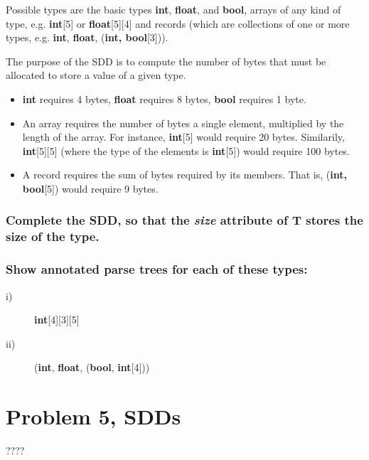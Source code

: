 Possible types are the basic types \textbf{int}, \textbf{float}, and \textbf{bool}, arrays of any kind of type, e.g. \textbf{int}[5] or \textbf{float}[5][4] and records (which are collections of one or more types, e.g. \textbf{int}, \textbf{float}, (\textbf{int, bool}[3])).

The purpose of the SDD is to compute the number of bytes that must be allocated to store a value of a given type.
\begin{itemize}
	\item \textbf{int} requires 4 bytes, \textbf{float} requires 8 bytes, \textbf{bool} requires 1 byte.
	\item An array requires the number of bytes a single element, multiplied by the length of the array. For instance, \textbf{int}[5] would require 20 bytes. Similarily, \textbf{int}[5][5] (where the type of the elements is \textbf{int}[5]) would require 100 bytes.
	\item A record requires the sum of bytes required by its members. That is, (\textbf{int, bool}[5]) would require 9 bytes.
\end{itemize}

\subsubsection{Complete the SDD, so that the \textit{size} attribute of T stores the size of the type.}

\subsubsection{Show annotated parse trees for each of these types:}
\begin{description}
	\item[i)] \textbf{int}[4][3][5]
	\item[ii)] (\textbf{int}, \textbf{float}, (\textbf{bool}, \textbf{int}[4]))
\end{description}

\newpage
\section{Problem 5, SDDs}
????
